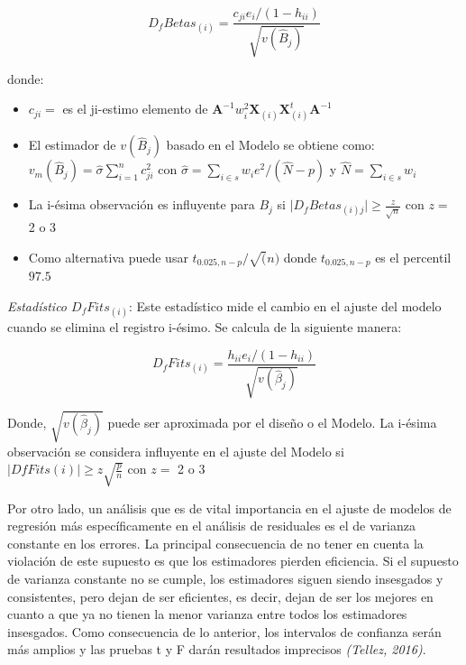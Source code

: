 \documentclass[
  12pt,
]{book}
\begin{document}
\[
D_fBetas_{\left(i\right)}=\frac{{c_{ji}e_{i}}\big/{\left(1-h_{ii}\right)}}{\sqrt{v\left(\hat{B}_{j}\right)}}
\]

donde:

\begin{itemize}
\item
  \(c_{ji}=\) es el ji-estimo elemento de \(\boldsymbol{A}^{-1}w_{i}^{2}\boldsymbol{X}_{\left(i\right)}\boldsymbol{X}_{\left(i\right)}^{t}\boldsymbol{A}^{-1}\)
\item
  El estimador de \(v\left(\hat{B}_{j}\right)\) basado en el Modelo se obtiene como: \(v_{m}\left(\hat{B}_{j}\right)=\hat{\sigma}\sum_{i=1}^{n}c_{ji}^{2}\) con \(\hat{\sigma}=\sum_{i\in s}w_{i}e^2/ \left( \hat{N} - p \right)\) y \(\hat{N} = \sum_{i \in s}w_{i}\)
\item
  La i-ésima observación es influyente para \(B_j\) si \(\mid D_{f}Betas_{\left(i\right)j}\mid\geq\frac{z}{\sqrt{n}}\) con \(z=\) 2 o 3
\item
  Como alternativa puede usar \(t_{0.025,n-p}/\sqrt(n)\) donde \(t_{0.025,n-p}\) es el percentil \(97.5\)
\end{itemize}

\emph{Estadístico \(D_{f}Fits_{\left(i\right)}\)}: Este estadístico mide el cambio en el ajuste del modelo cuando se elimina el registro i-ésimo. Se calcula de la siguiente manera:

\[
D_{f}Fits_{\left(i\right)}= \frac{h_{ii}e_{i}\big/\left(1-h_{ii}\right)}{\sqrt{v\left(\hat{\beta}_{j}\right)}}
\]

Donde, \(\sqrt{v\left(\hat{\beta}_{j}\right)}\) puede ser aproximada por el diseño o el Modelo. La i-ésima observación se considera influyente en el ajuste del Modelo si
\(\mid DfFits\left(i\right)\mid\geq z\sqrt{\frac{p}{n}}\) con \(z =\) 2 o 3

Por otro lado, un análisis que es de vital importancia en el ajuste de modelos de regresión más específicamente en el análisis de residuales es el de varianza constante en los errores. La principal consecuencia de no tener en cuenta la violación de este supuesto es que los estimadores pierden eficiencia. Si el supuesto de varianza constante no se cumple, los estimadores siguen siendo insesgados y consistentes, pero dejan de ser eficientes, es decir, dejan de ser los mejores en cuanto a que ya no tienen la menor varianza entre todos los estimadores insesgados. Como consecuencia de lo anterior, los intervalos de confianza serán más amplios y las pruebas t y F darán resultados imprecisos \emph{(Tellez, 2016)}.
\end{document}
